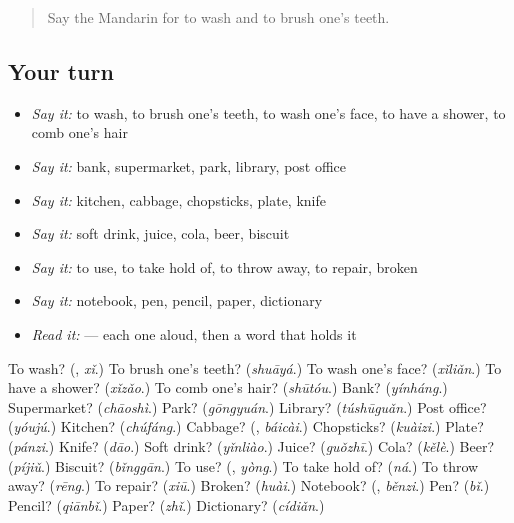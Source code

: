\label{lesson:ZH-R104-review-99-104}



\begin{quote}
Say the Mandarin for to wash and to brush one's teeth.
\end{quote}

\subsection*{Your turn}
\begin{itemize}
\raggedright
  \item \emph{Say it:} to wash, to brush one's teeth, to wash one's face, to have a shower, to comb one's hair
  \item \emph{Say it:} bank, supermarket, park, library, post office
  \item \emph{Say it:} kitchen, cabbage, chopsticks, plate, knife
  \item \emph{Say it:} soft drink, juice, cola, beer, biscuit
  \item \emph{Say it:} to use, to take hold of, to throw away, to repair, broken
  \item \emph{Say it:} notebook, pen, pencil, paper, dictionary
  \item \emph{Read it:}     — each one aloud, then a word that holds it
\end{itemize}

\begin{tcolorbox}[breakable,colback=teal!4,colframe=teal!35!black,title={Before you move on}]
To wash? (\textbf{}, \emph{xǐ}.) To brush one's teeth? (\emph{shuāyá}.) To wash one's face? (\emph{xǐliǎn}.) To have a shower? (\emph{xǐzǎo}.) To comb one's hair? (\emph{shūtóu}.) Bank? (\emph{yínháng}.) Supermarket? (\emph{chāoshì}.) Park? (\emph{gōngyuán}.) Library? (\emph{túshūguǎn}.) Post office? (\emph{yóujú}.) Kitchen? (\emph{chúfáng}.) Cabbage? (\textbf{}, \emph{báicài}.) Chopsticks? (\emph{kuàizi}.) Plate? (\emph{pánzi}.) Knife? (\emph{dāo}.) Soft drink? (\emph{yǐnliào}.) Juice? (\emph{guǒzhī}.) Cola? (\emph{kělè}.) Beer? (\emph{píjiǔ}.) Biscuit? (\emph{bǐnggān}.) To use? (\textbf{}, \emph{yòng}.) To take hold of? (\emph{ná}.) To throw away? (\emph{rēng}.) To repair? (\emph{xiū}.) Broken? (\emph{huài}.) Notebook? (\textbf{}, \emph{běnzi}.) Pen? (\emph{bǐ}.) Pencil? (\emph{qiānbǐ}.) Paper? (\emph{zhǐ}.) Dictionary? (\emph{cídiǎn}.)
\end{tcolorbox}
